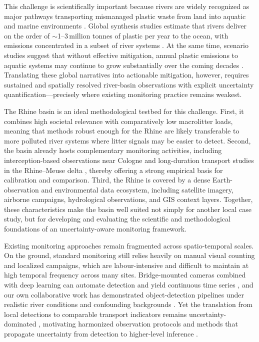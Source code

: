 \documentclass{scrartcl}
\begin{document}
This challenge is scientifically important because rivers are widely recognized as major pathways transporting mismanaged plastic waste from land into aquatic and marine environments \citep{caspers1987gesamp,unep2021,galgani2024revisiting}. Global synthesis studies estimate that rivers deliver on the order of \(\sim\)1--3\,million tonnes of plastic per year to the ocean, with emissions concentrated in a subset of river systems \citep{lebreton2017river,meijer2021more}. At the same time, scenario studies suggest that without effective mitigation, annual plastic emissions to aquatic systems may continue to grow substantially over the coming decades \citep{pew2020breaking,unsecretariat2025worldenvironmentday,deeney2026global}. Translating these global narratives into actionable mitigation, however, requires sustained and spatially resolved river-basin observations with explicit uncertainty quantification---precisely where existing monitoring practice remains weakest.

The Rhine basin is an ideal methodological testbed for this challenge. First, it combines high societal relevance with comparatively low macrolitter loads, meaning that methods robust enough for the Rhine are likely transferable to more polluted river systems where litter signals may be easier to detect. Second, the basin already hosts complementary monitoring activities, including interception-based observations near Cologne \citep{gnann2026river} and long-duration transport studies in the Rhine--Meuse delta \citep{van2022hydrology}, thereby offering a strong empirical basis for calibration and comparison. Third, the Rhine is covered by a dense Earth-observation and environmental data ecosystem, including satellite imagery, airborne campaigns, hydrological observations, and GIS context layers. Together, these characteristics make the basin well suited not simply for another local case study, but for developing and evaluating the scientific and methodological foundations of an uncertainty-aware monitoring framework.

Existing monitoring approaches remain fragmented across spatio-temporal scales. On the ground, standard monitoring still relies heavily on manual visual counting and localized campaigns, which are labour-intensive and difficult to maintain at high temporal frequency across many sites. Bridge-mounted cameras combined with deep learning can automate detection and yield continuous time series \citep{vanlieshout2020automated}, and our own collaborative work has demonstrated object-detection pipelines under realistic river conditions and confounding backgrounds . Yet the translation from local detections to comparable transport indicators remains uncertainty-dominated \citep{vriend2025uncertainties}, motivating harmonized observation protocols \citep{vanemmerik2023harmonized} and methods that propagate uncertainty from detection to higher-level inference \citep{cottom2024local}.
\end{document}
